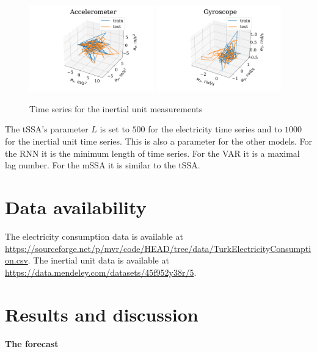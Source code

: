 \documentclass[referee, pdflatex, sn-mathphys-num]{sn-jnl}
\theoremstyle{definition}
\theoremstyle{plain}
\begin{document}
	\begin{figure}[!htbp]
		\centering
		\includegraphics[width=0.48\textwidth, keepaspectratio]{acceleromter_example.png}
		\includegraphics[width=0.48\textwidth, keepaspectratio]{gyro_example.png}
		\caption{Time series for the inertial unit measurements}\label{fig:motion_data}
	\end{figure}
	
	The tSSA's parameter $ L $ is set to $ 500 $ for the electricity time series and to $ 1000 $ for the inertial unit time series. This is also a parameter for the other models. For the RNN it is the minimum length of time series. For the VAR it is a maximal lag number. For the mSSA it is similar to the tSSA.
	
	\section{Data availability}
	
	The electricity consumption data is available at \url{https://sourceforge.net/p/mvr/code/HEAD/tree/data/TurkElectricityConsumption.csv}. The inertial unit data is available at \url{https://data.mendeley.com/datasets/45f952y38r/5}.
	
	\section{Results and discussion}
	
	\paragraph{The forecast}
	
\end{document}
